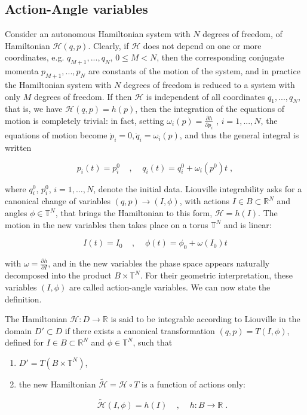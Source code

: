 \subsection{Action-Angle variables}
Consider an autonomous Hamiltonian system with $N$ degrees of freedom, of Hamiltonian $\mathcal{H}(q, p)$. Clearly, if $\mathcal{H}$ does not depend on one or more coordinates, e.g. $q_{M+1}, . . . , q_N$, $0 \leq M < N$, then the corresponding conjugate momenta $p_{M+1}, . . . , p_N$ are constants of the motion of the system, and in practice the Hamiltonian system with $N$ degrees of freedom is reduced to a system with only $M$ degrees of freedom. If then $\mathcal{H}$ is independent of all coordinates $q_1, . . . , q_N$, that is, we have $\mathcal{H}(q, p) = h(p)$, then the integration of the equations of motion is completely trivial: in fact, setting $\omega_i(p) = \frac{\partial h}{\partial p_i}$ , $i = 1, . . . , N$, the equations of motion become $\dot p_i = 0, \dot q_i = \omega_i(p)$, and thus the general integral is written

\begin{equation}
p_i(t) = p_i^0 \;\;\;\;,\;\;\;\; q_i(t) = q_i^0 + \omega_i(p^0)t\;, \end{equation}

where $q_i^0$, $p_i^0$, $i = 1, \dots, N$, denote the initial data.
Liouville integrability asks for a canonical change of variables $(q,p) \to (I, \phi)$, with actions $I \in B \subset \mathbb{R}^N$ and angles $\phi \in \mathbb{T}^N$, that brings the Hamiltonian to this form, $\mathcal{H} = h(I)$. The motion in the new variables then takes place on a torus $\mathbb{T}^N$ and is linear:

\begin{equation}
    I(t) = I_0\;\;\;\; , \;\;\;\;\phi(t) = \phi_0 + \omega(I_0)t
\end{equation}

with $\omega = \frac{\partial h}{\partial I}$, and in the new variables the phase space appears naturally decomposed into the product $B \times \mathbb{T}^N$. For their geometric interpretation, these variables $(I, \phi)$ are called action-angle variables. We can now state the definition.

\begin{defi}
The Hamiltonian $\mathcal{H} : D \to \mathbb{R}$ is said to be integrable according to Liouville in the domain $D' \subset D$
if there exists a canonical transformation $(q, p) = T(I, \phi)$, defined for $I \in B \subset \mathbb{R}^N$ and $\phi \in \mathbb{T}^N$, such that

\begin{enumerate}
\item $D' = T(B \times \mathbb{T}^N)$, 
\item the new Hamiltonian $\tilde{\mathcal{H}} = \mathcal{H} \circ T$ is a function of actions only:

\[\tilde{\mathcal{H}}(I, \phi) = h(I)\;\;\;\;,\;\;\;\; h : B \to \mathbb{R} \;.\]
\end{enumerate}
\end{defi}

